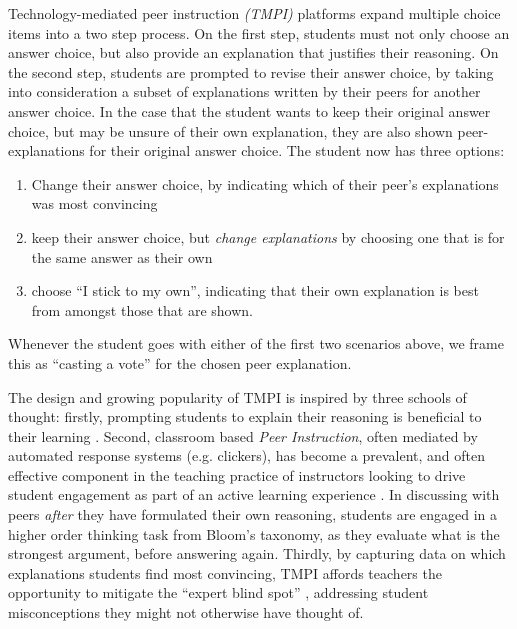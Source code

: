 \documentclass[sigconf]{acmart}
\begin{document}
Technology-mediated peer instruction \textit{(TMPI)} platforms 
\cite{charles_harnessing_2019}\cite{univeristy_of_british_columbia_ubc/ubcpi_2019}
expand multiple choice items into a two step process.
On the first step, students must not only choose an answer choice, but also 
provide an explanation that justifies their reasoning. 
On the second step, students are prompted to revise their answer choice, by 
taking into consideration a subset of explanations written by their peers for
another answer choice.
In the case that the student wants to keep their original answer choice, but 
may be unsure of their own explanation, they are also shown peer-explanations 
for their original answer choice. 
The student now has three options:
\begin{enumerate}
	\item Change their answer choice, by indicating which of their peer's 
	explanations was most convincing
	\item keep their answer choice, but \textit{change explanations} by 
	choosing one that is for the same answer as their own
	\item choose ``I stick to my own'', indicating that their own explanation 
	is best from amongst those that are shown.
\end{enumerate}

Whenever the student goes with either of the first two scenarios above, we 
frame this as ``casting a vote'' for the chosen peer explanation.

The design and growing popularity of TMPI is inspired by three schools of 
thought: firstly, prompting students to explain their reasoning is beneficial 
to their learning \cite{chi_eliciting_1994}. 
Second, classroom based \textit{Peer Instruction}\cite{crouch_peer_2001}, often 
mediated by automated response systems (e.g. clickers), has become a prevalent, 
and often effective component in the teaching practice of instructors looking 
to drive student engagement as part of an active learning experience 
\cite{charles_beyond_2015}. 
In discussing with peers \textit{after} they have formulated their own 
reasoning, students are engaged in a higher order thinking task from Bloom's 
taxonomy, as they evaluate what is the strongest argument, before answering 
again.
Thirdly, by capturing data on which explanations students find most convincing, 
TMPI affords teachers the opportunity to mitigate the ``expert blind spot'' 
\cite{nathan_expert_2001}, addressing student misconceptions they might not 
otherwise have thought of.
\end{document}
